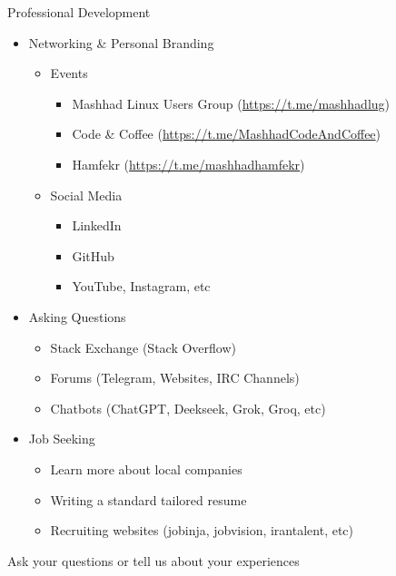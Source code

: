\documentclass[xcolor={rgb}]{beamer}
\newcommand{\pitem}{\pause\item}
\begin{document}
	\begin{frame}{Professional Development}
		\begin{itemize}
			\pitem Networking \& Personal Branding
			\begin{itemize}
				\pitem Events
				\begin{itemize}
					\item Mashhad Linux Users Group (\url{https://t.me/mashhadlug})
					\item Code \& Coffee (\url{https://t.me/MashhadCodeAndCoffee})
					\item Hamfekr (\url{https://t.me/mashhadhamfekr})
				\end{itemize}

				\pitem Social Media
				\begin{itemize}
					\item LinkedIn
					\item GitHub
					\item YouTube, Instagram, etc
				\end{itemize}
			\end{itemize}
			
			\pitem Asking Questions
			\begin{itemize}
				\item Stack Exchange (Stack Overflow)
				\item Forums (Telegram, Websites, IRC Channels)
				\item Chatbots (ChatGPT, Deekseek, Grok, Groq, etc)
			\end{itemize}

			\pitem Job Seeking
			\begin{itemize}
				\item Learn more about local companies
				\item Writing a standard tailored resume
				\item Recruiting websites (jobinja, jobvision, irantalent, etc)
			\end{itemize}
		\end{itemize}
	\end{frame}

	\begin{frame}
	\vfill
	\begin{center}
		\Huge Ask your questions or tell us about your experiences
	\end{center}
	\vfill
	\end{frame}
\end{document}

